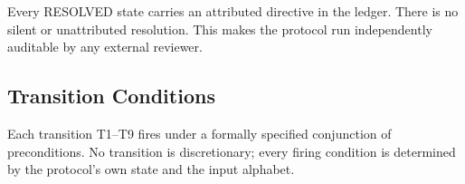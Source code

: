 Every RESOLVED state carries an attributed directive in the ledger. There is no silent or unattributed resolution. This makes the protocol run independently auditable by any external reviewer.

\subsection{Transition Conditions}\label{sec:transitions}

Each transition T1--T9 fires under a formally specified conjunction of preconditions. No transition is discretionary; every firing condition is determined by the protocol's own state and the input alphabet.


